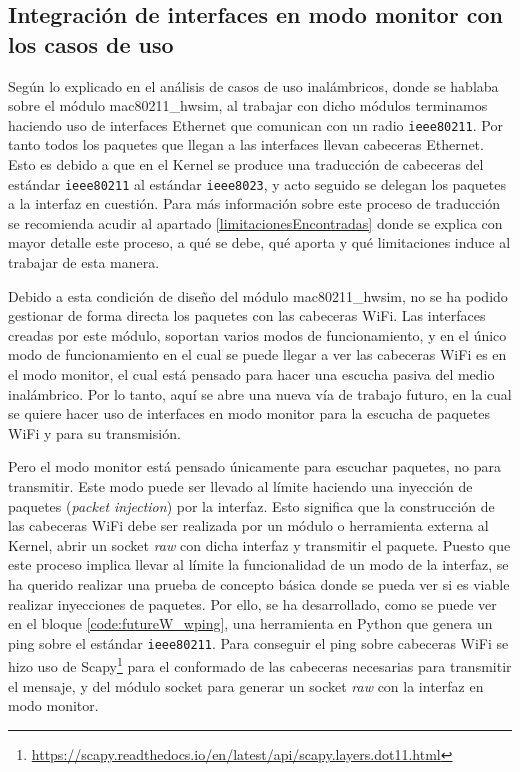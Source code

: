 \subsection{Integración de interfaces en modo monitor con los casos de uso}

Según lo explicado en el análisis de casos de uso inalámbricos, donde se hablaba sobre el módulo mac80211\_hwsim, al trabajar con dicho módulos terminamos haciendo uso de interfaces Ethernet que comunican con un radio \texttt{ieee80211}. Por tanto todos los paquetes que llegan a las interfaces llevan cabeceras Ethernet. Esto es debido a que en el Kernel se produce una traducción de cabeceras del estándar \texttt{ieee80211} al estándar \texttt{ieee8023}, y acto seguido se delegan los paquetes a la interfaz en cuestión. Para más información sobre este proceso de traducción se recomienda acudir al apartado \ref{limitacionesEncontradas} donde se explica con mayor detalle este proceso, a qué se debe, qué aporta y qué limitaciones induce al trabajar de esta manera.\\

\par
Debido a esta condición de diseño del módulo mac80211\_hwsim, no se ha podido gestionar de forma directa los paquetes con las cabeceras WiFi. Las interfaces creadas por este módulo, soportan varios modos de funcionamiento, y en el único modo de funcionamiento en el cual se puede llegar a ver las cabeceras WiFi es en el modo monitor, el cual está pensado para hacer una escucha pasiva del medio inalámbrico. Por lo tanto, aquí se abre una nueva vía de trabajo futuro, en la cual se quiere hacer uso de interfaces en modo monitor para la escucha de paquetes WiFi y para su transmisión. \\

\par

Pero el modo monitor está pensado únicamente para escuchar paquetes, no para transmitir. Este modo puede ser llevado al límite haciendo una inyección de paquetes (\textit{packet injection}) por la interfaz. Esto significa que la construcción de las cabeceras WiFi debe ser realizada por un módulo o herramienta externa al Kernel, abrir un socket \textit{raw} con dicha interfaz y transmitir el paquete. Puesto que este proceso implica llevar al límite la funcionalidad de un modo de la interfaz, se ha querido realizar una prueba de concepto básica donde se pueda ver si es viable realizar inyecciones de paquetes. Por ello, se ha desarrollado, como se puede ver en el bloque \ref{code:futureW_wping}, una herramienta en Python que genera un ping sobre el estándar \texttt{ieee80211}. Para conseguir el ping sobre cabeceras WiFi se hizo uso de Scapy\footnote{\url{https://scapy.readthedocs.io/en/latest/api/scapy.layers.dot11.html}} para el conformado de las cabeceras necesarias para transmitir el mensaje, y del módulo socket para generar un socket \textit{raw} con la interfaz en modo monitor.

